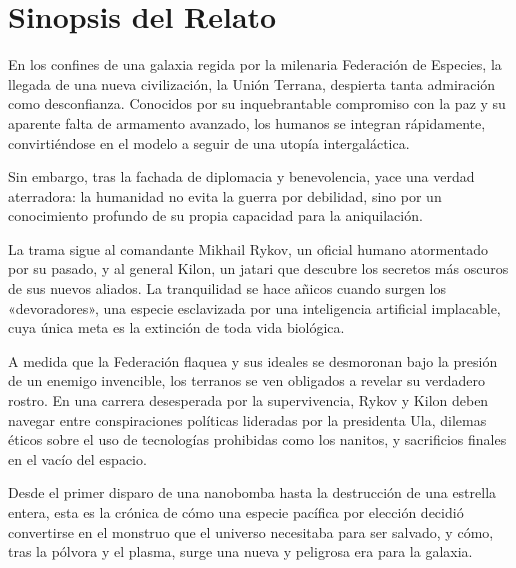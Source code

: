 \chapter*{Sinopsis del Relato}\label{sec:sinopsis-del-relato}

En los confines de una galaxia regida por la milenaria Federación de Especies, la llegada de una nueva civilización, la Unión Terrana, despierta tanta admiración como desconfianza. Conocidos por su inquebrantable compromiso con la paz y su aparente falta de armamento avanzado, los humanos se integran rápidamente, convirtiéndose en el modelo a seguir de una utopía intergaláctica.

Sin embargo, tras la fachada de diplomacia y benevolencia, yace una verdad aterradora: la humanidad no evita la guerra por debilidad, sino por un conocimiento profundo de su propia capacidad para la aniquilación.

La trama sigue al comandante Mikhail Rykov, un oficial humano atormentado por su pasado, y al general Kilon, un jatari que descubre los secretos más oscuros de sus nuevos aliados. La tranquilidad se hace añicos cuando surgen los «devoradores», una especie esclavizada por una inteligencia artificial implacable, cuya única meta es la extinción de toda vida biológica.

A medida que la Federación flaquea y sus ideales se desmoronan bajo la presión de un enemigo invencible, los terranos se ven obligados a revelar su verdadero rostro. En una carrera desesperada por la supervivencia, Rykov y Kilon deben navegar entre conspiraciones políticas lideradas por la presidenta Ula, dilemas éticos sobre el uso de tecnologías prohibidas como los nanitos, y sacrificios finales en el vacío del espacio.

Desde el primer disparo de una nanobomba hasta la destrucción de una estrella entera, esta es la crónica de cómo una especie pacífica por elección decidió convertirse en el monstruo que el universo necesitaba para ser salvado, y cómo, tras la pólvora y el plasma, surge una nueva y peligrosa era para la galaxia.
